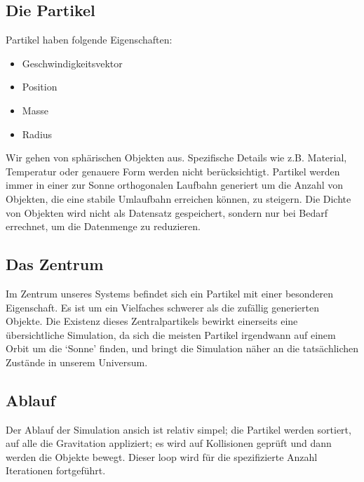 
\subsection{Die Partikel}
Partikel haben folgende Eigenschaften:
\begin{itemize}
    \item Geschwindigkeitsvektor
    \item Position
    \item Masse
    \item Radius
\end{itemize}
Wir gehen von sphärischen Objekten aus. Spezifische Details wie z.B.
Material, Temperatur oder genauere Form werden nicht berücksichtigt.
Partikel werden immer in einer zur Sonne orthogonalen Laufbahn generiert
um die Anzahl von Objekten, die eine stabile Umlaufbahn erreichen können,
zu steigern. Die Dichte von Objekten wird nicht als Datensatz gespeichert,
sondern nur bei Bedarf errechnet, um die Datenmenge zu reduzieren.

\subsection{Das Zentrum}
Im Zentrum unseres Systems befindet sich ein Partikel mit einer besonderen
Eigenschaft. Es ist um ein Vielfaches schwerer als die zufällig generierten Objekte.
Die Existenz dieses Zentralpartikels bewirkt einerseits eine übersichtliche Simulation,
da sich die meisten Partikel irgendwann auf einem Orbit um die `Sonne' finden,
und bringt die Simulation näher an die tatsächlichen Zustände in unserem Universum.

\subsection{Ablauf}
Der Ablauf der Simulation ansich ist relativ simpel; die Partikel werden sortiert,
auf alle die Gravitation appliziert; es wird auf Kollisionen geprüft und dann werden
die Objekte bewegt. Dieser loop wird für die spezifizierte Anzahl Iterationen
fortgeführt.

